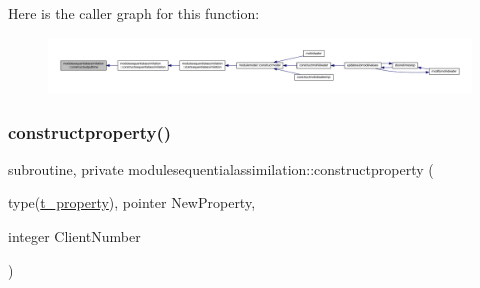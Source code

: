 Here is the caller graph for this function\+:\nopagebreak
\begin{figure}[H]
\begin{center}
\leavevmode
\includegraphics[width=350pt]{namespacemodulesequentialassimilation_a4636d1cd0c10613f19a1ca651b6b482f_icgraph}
\end{center}
\end{figure}
\mbox{\label{namespacemodulesequentialassimilation_a37aa5f00e0026d3fb403e9d6fd041de3}} 
\subsubsection{\texorpdfstring{constructproperty()}{constructproperty()}}
{\footnotesize\ttfamily subroutine, private modulesequentialassimilation\+::constructproperty (\begin{DoxyParamCaption}\item[{type(\mbox{\hyperlink{structmodulesequentialassimilation_1_1t__property}{t\+\_\+property}}), pointer}]{New\+Property,  }\item[{integer}]{Client\+Number }\end{DoxyParamCaption})\hspace{0.3cm}{\ttfamily [private]}}

